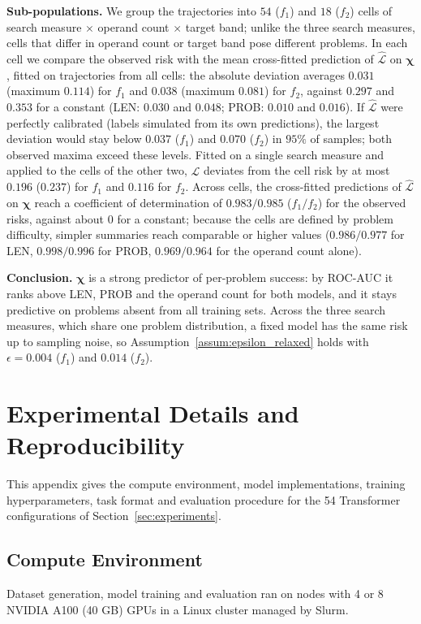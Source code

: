 \textbf{Sub-populations.} We group the trajectories into $54$ ($f_1$) and $18$ ($f_2$) cells of search measure $\times$ operand count $\times$ target band; unlike the three search measures, cells that differ in operand count or target band pose different problems. In each cell we compare the observed risk with the mean cross-fitted prediction of $\hat{\mathcal{L}}$ on $\boldsymbol{\chi}$, fitted on trajectories from all cells: the absolute deviation averages $0.031$ (maximum $0.114$) for $f_1$ and $0.038$ (maximum $0.081$) for $f_2$, against $0.297$ and $0.353$ for a constant (LEN: $0.030$ and $0.048$; PROB: $0.010$ and $0.016$). If $\hat{\mathcal{L}}$ were perfectly calibrated (labels simulated from its own predictions), the largest deviation would stay below $0.037$ ($f_1$) and $0.070$ ($f_2$) in $95\%$ of samples; both observed maxima exceed these levels. Fitted on a single search measure and applied to the cells of the other two, $\hat{\mathcal{L}}$ deviates from the cell risk by at most $0.196$ ($0.237$) for $f_1$ and $0.116$ for $f_2$. Across cells, the cross-fitted predictions of $\hat{\mathcal{L}}$ on $\boldsymbol{\chi}$ reach a coefficient of determination of $0.983/0.985$ ($f_1/f_2$) for the observed risks, against about $0$ for a constant; because the cells are defined by problem difficulty, simpler summaries reach comparable or higher values ($0.986/0.977$ for LEN, $0.998/0.996$ for PROB, $0.969/0.964$ for the operand count alone).

\textbf{Conclusion.} $\boldsymbol{\chi}$ is a strong predictor of per-problem success: by ROC-AUC it ranks above LEN, PROB and the operand count for both models, and it stays predictive on problems absent from all training sets. Across the three search measures, which share one problem distribution, a fixed model has the same risk up to sampling noise, so Assumption~\ref{assum:epsilon_relaxed} holds with $\epsilon=0.004$ ($f_1$) and $0.014$ ($f_2$).

\section{Experimental Details and Reproducibility}
\label{app:reproducibility}

This appendix gives the compute environment, model implementations, training hyperparameters, task format and evaluation procedure for the 54 Transformer configurations of Section~\ref{sec:experiments}.

\subsection{Compute Environment}
Dataset generation, model training and evaluation ran on nodes with 4 or 8 NVIDIA A100 (40 GB) GPUs in a Linux cluster managed by Slurm. %

